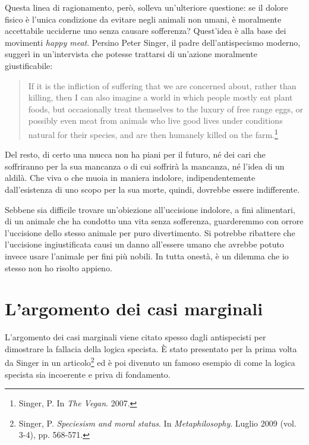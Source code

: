 \documentclass[a4paper,11pt,oneside,article]{memoir}
\begin{document}
Questa linea di ragionamento, però, solleva un'ulteriore questione: se il dolore
fisico è l'unica condizione da evitare negli animali non umani, è moralmente
accettabile ucciderne uno senza causare sofferenza? Quest'idea è alla base dei
movimenti \emph{happy meat}. Persino Peter Singer, il padre dell'antispecismo
moderno, suggerì in un'intervista che potesse trattarsi di un'azione moralmente
giustificabile:

\begin{quote}

If it is the infliction of suffering that we are concerned about, rather than
killing, then I can also imagine a world in which people mostly eat plant foods,
but occasionally treat themselves to the luxury of free range eggs, or possibly
even meat from animals who live good lives under conditions natural for their
species, and are then humanely killed on the farm.\footnote{Singer, P. In
\emph{The Vegan}. 2007.}

\end{quote}

Del resto, di certo una mucca non ha piani per il futuro, né dei cari che
soffriranno per la sua mancanza o di cui soffrirà la mancanza, né l'idea di un
aldilà. Che viva o che muoia in maniera indolore, indipendentemente
dall'esistenza di uno scopo per la sua morte, quindi, dovrebbe essere
indifferente.

Sebbene sia difficile trovare un'obiezione all'uccisione indolore, a fini
alimentari, di un animale che ha condotto una vita senza sofferenza, guarderemmo
con orrore l'uccisione dello stesso animale per puro divertimento. Si potrebbe
ribattere che l'uccisione ingiustificata causi un danno all'essere umano che
avrebbe potuto invece usare l'animale per fini più nobili. In tutta onestà, è un
dilemma che io stesso non ho risolto appieno.

\section{L'argomento dei casi marginali}

L'argomento dei casi marginali viene citato spesso dagli antispecisti per
dimostrare la fallacia della logica specista. È stato presentato per la prima
volta da Singer in un articolo\footnote{Singer, P. \emph{Speciesism and moral
status}. In \emph{Metaphilosophy}. Luglio 2009 (vol. 3-4), pp. 568-571.} ed è
poi divenuto un famoso esempio di come la logica specista sia incoerente e priva
di fondamento.
\end{document}
